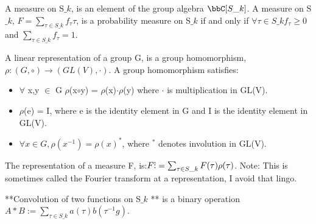 \documentclass[12pt,a4paper]{article}
\begin{document}
A measure on S\ensuremath{\_k}, is an element of the group algebra $\ensuremath{\bbC}[S\ensuremath{\_k}]$. A measure on S\ensuremath{\_k}, $F = \ensuremath{\sum}_{\ensuremath{\tau} \ensuremath{\in} S\ensuremath{\_k}} f_\ensuremath{\tau} \ensuremath{\tau}$, is a probability measure on S\ensuremath{\_k} if and only if $\ensuremath{\forall} \ensuremath{\tau} \ensuremath{\in} S\ensuremath{\_k} f_\ensuremath{\tau} \ensuremath{\geq} 0$ and $\ensuremath{\sum}_{\ensuremath{\tau} \ensuremath{\in} S\ensuremath{\_k}} f_\ensuremath{\tau} = 1$.

A linear representation of a group G, is a group homomorphism, $\ensuremath{\rho} : (G,\ensuremath{\circ}) \ensuremath{\rightarrow} (GL(V),\ensuremath{\cdot})$. A group homomorphism satisfies:

\begin{itemize}
\item \ensuremath{\forall} x,y \ensuremath{\in} G \ensuremath{\rho}(x\ensuremath{\circ}y) = \ensuremath{\rho}(x)\ensuremath{\cdot}\ensuremath{\rho}(y) where \ensuremath{\cdot} is multiplication in GL(V).


\item \ensuremath{\rho}(e) = I, where e is the identity element in G and I is the identity element in GL(V).


\item $\ensuremath{\forall} x \ensuremath{\in} G, \ensuremath{\rho}(x^{-1}) = \ensuremath{\rho}(x)^*$, where $^*$ denotes involution in GL(V).

\end{itemize}

The representation of a measure F, is:$F\ensuremath{\hat} := \ensuremath{\sum}_{\ensuremath{\tau} \ensuremath{\in} S\ensuremath{\_k}} F(\ensuremath{\tau})\ensuremath{\rho}(\ensuremath{\tau})$. Note: This is sometimes called the Fourier transform at a representation, I avoid that lingo. 

**Convolution of two functions on S\ensuremath{\_k} ** is a binary operation $A * B := \ensuremath{\sum}_{\ensuremath{\tau} \ensuremath{\in} S\ensuremath{\_k}} a(\ensuremath{\tau}) b(\ensuremath{\tau}^{-1}g)$.
\end{document}
